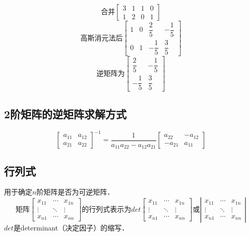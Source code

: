 \documentclass[12pt]{article}
\begin{document}
\begin{CJK}{UTF8}{gbsn}
\begin{equation}
\text{合并}\left[
\begin{array}{cccc}
3 & 1 & 1 & 0 \\
1 & 2 & 0 & 1
\end{array}
\right]
\end{equation}
\begin{equation}
\text{高斯消元法后}\left[
\begin{array}{cccc}
1 & 0 & \dfrac{2}{5} & -\dfrac{1}{5} \\
0 & 1 & -\dfrac{1}{5} & \dfrac{3}{5}
\end{array}
\right]
\end{equation}
\begin{equation}
\text{逆矩阵为}\left[
\begin{array}{cc}
\dfrac{2}{5} & -\dfrac{1}{5} \\
-\dfrac{1}{5} & \dfrac{3}{5}
\end{array}
\right]
\end{equation}
\subsection{2阶矩阵的逆矩阵求解方式}
\begin{equation}
\left[
\begin{array}{cc}
a_{11} & a_{12}\\
a_{21} & a_{22}
\end{array}
\right]^{-1}
=
\dfrac{1}{a_{11}a_{22}-a_{12}a_{21}}
\left[
\begin{array}{cc}
a_{22} & -a_{12}\\
-a_{21} & a_{11}
\end{array}
\right]
\end{equation}

\subsection{行列式}
用于确定$n$阶矩阵是否为可逆矩阵．
\begin{equation}
\text{矩阵}\left[
\begin{array}{ccc}
x_{11} & \cdots & x_{1n} \\
\vdots & \ddots & \vdots \\
x_{n1} & \cdots & x_{nn}
\end{array}
\right]\text{的行列式表示为}
det\left[
\begin{array}{ccc}
x_{11} & \cdots & x_{1n} \\
\vdots & \ddots & \vdots \\
x_{n1} & \cdots & x_{nn}
\end{array}
\right] \text{或}
\left|
\begin{array}{ccc}
x_{11} & \cdots & x_{1n} \\
\vdots & \ddots & \vdots \\
x_{n1} & \cdots & x_{nn}
\end{array}
\right|
\end{equation}
$det$是determinant（决定因子）的缩写．

\end{CJK}
\end{document}
